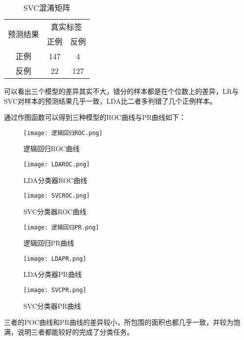 \documentclass{ctexart}
\begin{document}
\begin{table}[H]
	\large
	\centering
	\begin{tabular}{c|c|c}
	\hline
	\multirow{2}{*}{预测结果}&\multicolumn{2}{c}{真实标签}\\ \cline{2-3}
	&正例&反例\\
	\hline
	正例&147&4\\
	\hline
	反例&22&127\\
	\hline
	\end{tabular}
	\caption{SVC混淆矩阵}
\end{table}
可以看出三个模型的差异其实不大，错分的样本都是在个位数上的差异，LR与SVC对样本的预测结果几乎一致，LDA比二者多判错了几个正例样本。


通过作图函数可以得到三种模型的ROC曲线与PR曲线如下：
\begin{figure}[H]
\texttt{[image: 逻辑回归ROC.png]}
\caption{逻辑回归ROC曲线}
\end{figure}

\begin{figure}[H]
\texttt{[image: LDAROC.png]}
\caption{LDA分类器ROC曲线}
\end{figure}

\begin{figure}[H]
\texttt{[image: SVCROC.png]}
\caption{SVC分类器ROC曲线}
\end{figure}

\begin{figure}[H]
\texttt{[image: 逻辑回归PR.png]}
\caption{逻辑回归PR曲线}
\end{figure}

\begin{figure}[H]
\texttt{[image: LDAPR.png]}
\caption{LDA分类器PR曲线}
\end{figure}

\begin{figure}[H]
\texttt{[image: SVCPR.png]}
\caption{SVC分类器PR曲线}
\end{figure}

三者的POC曲线和PR曲线的差异较小，所包围的面积也都几乎一致，并较为饱满，说明三者都能较好的完成了分类任务。
\end{document}
